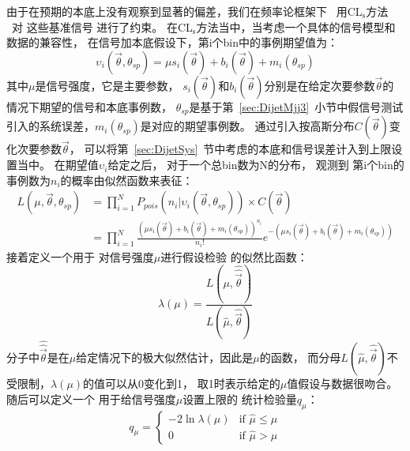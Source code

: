 由于在预期的本底上没有观察到显著的偏差，我们在频率论框架下~\cite{Baak:2014wma}
用CL$_\text{s}$方法 ~\cite{Read:2002hq}对
这些基准信号
进行了约束。
在CL$_\text{s}$方法当中，当考虑一个具体的信号模型和数据的兼容性，
在信号加本底假设下，第i个bin中的事例期望值为：
\begin{equation} 
\label{eq:Limit1}
\upsilon_i(\vec{\theta},\theta_{sp})=\mu s_i(\vec{\theta}) + b_i (\vec{\theta})+m_i(\theta_{sp})
\end{equation}
其中$\mu$是信号强度，它是主要参数，
$s_i(\vec{\theta})$和$b_i (\vec{\theta})$分别是在给定次要参数$\vec{\theta}$的情况下期望的信号和本底事例数，
$\theta_{sp}$是基于第~\ref{sec:DijetMjj3}~小节中假信号测试引入的系统误差，$m_i(\theta_{sp})$是对应的期望事例数。
通过引入按高斯分布$C(\vec{\theta})$变化次要参数$\vec{\theta}$，
可以将第~\ref{sec:DijetSys}~节中考虑的本底和信号误差计入到上限设置当中。
在期望值$\upsilon_i$给定之后，
对于一个总bin数为N的分布，
观测到
第i个bin的事例数为$n_i$的概率由似然函数来表征：
\begin{equation} 
\label{eq:Limit2}
\begin{split}
L(\mu,\vec{\theta},\theta_{sp})&= \prod^N_{i=1} P_{pois}(n_i|\upsilon_i(\vec{\theta},\theta_{sp})) \times C(\vec{\theta})
\\
&=\prod^N_{i=1} \frac{(\mu s_i(\vec{\theta}) + b_i (\vec{\theta})+m_i(\theta_{sp}))^{n_i}}{n_i !} e^{-(\mu s_i(\vec{\theta}) + b_i (\vec{\theta})+m_i(\theta_{sp}))}
\end{split}
\end{equation}
接着定义一个用于
对信号强度$\mu$进行假设检验
的似然比函数：
\begin{equation} 
\label{eq:Limit3}
\lambda(\mu)=\frac{L(\mu,\hat{\hat{\vec{\theta}}})}{L(\hat{\mu},\hat{\vec{\theta}})}
\end{equation}
分子中$\hat{\hat{\vec{\theta}}}$是在$\mu$给定情况下的极大似然估计，因此是$\mu$的函数，
而分母$L(\hat{\mu},\hat{\vec{\theta}})$不受限制，$\lambda(\mu)$的值可以从0变化到1，
取1时表示给定的$\mu$值假设与数据很吻合。
随后可以定义一个
用于给信号强度$\mu$设置上限的
统计检验量$q_{\mu}$：
\begin{equation} 
\label{eq:Limit4}
q_{\mu} =
    \begin{cases}
      -2\ln \lambda(\mu) & \text{if $\hat{\mu} \le \mu$} \\
      0 & \text{if $\hat{\mu} > \mu$}
    \end{cases}  
\end{equation}
